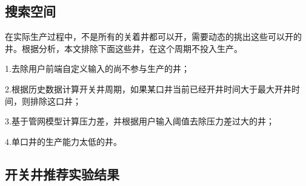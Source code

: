 \subsection{搜索空间}
在实际生产过程中，不是所有的关着井都可以开，需要动态的挑出这些可以开的井。根据分析，本文排除下面这些井，在这个周期不投入生产。

1.去除用户前端自定义输入的尚不参与生产的井；

2.根据历史数据计算开关井周期，如果某口井当前已经开井时间大于最大开井时间，则排除这口井；

3.基于管网模型计算压力差，并根据用户输入阈值去除压力差过大的井；

4.单口井的生产能力太低的井。
\subsection{开关井推荐实验结果}

